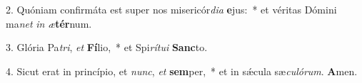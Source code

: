 2. Quóniam confirmáta est super nos misericór\textit{di}\textit{a} \textbf{e}jus:~*  et véritas Dómini ma\textit{net} \textit{in} \textit{æ}\textbf{tér}num.\

3. Glória Pa\textit{tri}, \textit{et} \textbf{Fí}lio,~*  et Spi\textit{rí}\textit{tu}\textit{i} \textbf{Sanc}to.\

4. Sicut erat in princípio, et \textit{nunc}, \textit{et} \textbf{sem}per,~*  et in sǽcula sæ\textit{cu}\textit{ló}\textit{rum}. \textbf{A}men.\

